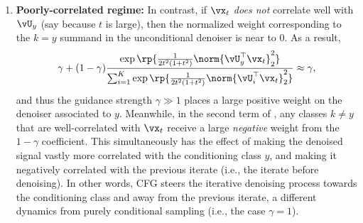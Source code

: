 \documentclass[../../book-main.tex]{subfiles}
\begin{document}
\begin{example}
\begin{enumerate}
      is approximately equal to the denoiser associated to the conditioning
      class $y$.
    \item \textbf{Poorly-correlated regime:} In contrast, if $\vx_t$
      \textit{does not} correlate well with $\vU_y$ (say because $t$ is large),
      then the normalized weight corresponding to the $k=y$ summand in the
      unconditional denoiser is near to $0$. As a result, 
      \begin{equation}
        \gamma + (1 - \gamma) 
      \frac{\exp\rp{\frac{1}{2t^{2}(1
      + t^{2})}\norm{\vU_{y}^{\top}\vx_t}_{2}^{2}}}{\sum_{i
      = 1}^{K}\exp\rp{\frac{1}{2t^{2}(1
      + t^{2})}\norm{\vU_{i}^{\top}\vx_t}_{2}^{2}}}
        \approx \gamma,
      \end{equation}
      and thus the guidance strength $\gamma \gg 1$ places a large positive
      weight on the denoiser associated to $y$.
      Meanwhile, in the second term of ,
      any classes $k \neq y$ that are well-correlated with $\vx_t$ 
      receive a large \textit{negative} weight from the $1 - \gamma$
      coefficient.
      This simultaneously has the effect of making the denoised signal vastly
      more correlated with the conditioning class $y$, and making it negatively
      correlated with the previous iterate (i.e., the iterate before denoising).
      In other words, CFG steers the iterative denoising process towards the
      conditioning class and away from the previous iterate, a different
      dynamics from purely conditional sampling (i.e., the case $\gamma = 1$).
  \end{enumerate}


\end{example}
\end{document}
